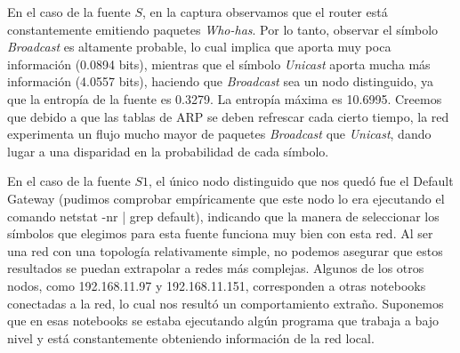 En el caso de la fuente $S$, en la captura observamos que el router está constantemente emitiendo paquetes \textit{Who-has}. Por lo tanto, observar el símbolo \textit{Broadcast} es altamente probable, lo cual implica que aporta muy poca información (0.0894 bits), mientras que el símbolo \textit{Unicast} aporta mucha más información (4.0557 bits), haciendo que \textit{Broadcast} sea un nodo distinguido, ya que la entropía de la fuente es 0.3279. La entropía máxima es 10.6995. Creemos que debido a que las tablas de ARP se deben refrescar cada cierto tiempo, la red experimenta un flujo mucho mayor de paquetes \textit{Broadcast} que \textit{Unicast}, dando lugar a una disparidad en la probabilidad de cada símbolo.

En el caso de la fuente $S1$, el único nodo distinguido que nos quedó fue el Default Gateway (pudimos comprobar empíricamente que este nodo lo era ejecutando el comando netstat -nr | grep default), indicando que la manera de seleccionar los símbolos que elegimos para esta fuente funciona muy bien con esta red. Al ser una red con una topología relativamente simple, no podemos asegurar que estos resultados se puedan extrapolar a redes más complejas. Algunos de los otros nodos, como 192.168.11.97 y 192.168.11.151, corresponden a otras notebooks conectadas a la red, lo cual nos resultó un comportamiento extraño. Suponemos que en esas notebooks se estaba ejecutando algún programa que trabaja a bajo nivel y está constantemente obteniendo información de la red local.
